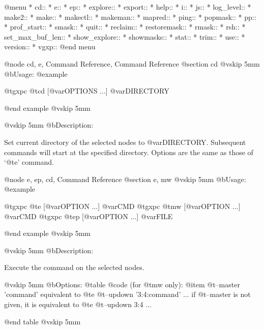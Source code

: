 @menu
* cd::                          
* e::                           
* ep::                          
* explore::                     
* export::                      
* help::                        
* i::                           
* js::                          
* log_level::                   
* make2::                       
* make::                        
* makectl::                     
* makeman::                     
* mapred::                      
* ping::                        
* popmask::                     
* pp::                          
* prof_start::                  
* smask::                       
* quit::                        
* reclaim::                     
* restoremask::                 
* rmask::                       
* rsh::                         
* set_max_buf_len::             
* show_explore::                
* showmasks::                   
* stat::                        
* trim::                        
* use::                         
* version::                     
* vgxp::                        
@end menu

@node cd, e, Command Reference, Command Reference
@section cd
@vskip 5mm
@b{Usage:}
@example

  @t{gxpc} @t{cd} [@var{OPTIONS} ...] @var{DIRECTORY}

@end example
@vskip 5mm

@vskip 5mm
@b{Description:}


  Set current directory of the selected nodes to @var{DIRECTORY}.
Subsequent commands will start at the specified directory.
Options are the same as those of `@t{e}' command.

@node e, ep, cd, Command Reference
@section e, mw
@vskip 5mm
@b{Usage:}
@example

  @t{gxpc} @t{e}  [@var{OPTION} ...] @var{CMD}
  @t{gxpc} @t{mw} [@var{OPTION} ...] @var{CMD}
  @t{gxpc} @t{ep} [@var{OPTION} ...] @var{FILE}

@end example
@vskip 5mm

@vskip 5mm
@b{Description:}


  Execute the command on the selected nodes.

@vskip 5mm
@b{Options: }
@table @code
(for @t{mw} only):
@item   @t{--master} 'command'
    equivalent to @t{e} @t{--updown} '3:4:command' ...
  if @t{--master} is not given, it is equivalent to @t{e} @t{--updown} 3:4 ...

@end table
@vskip 5mm

